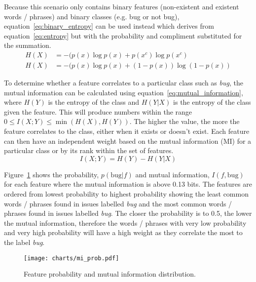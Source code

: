 Because this scenario only contains binary features (non-existent and existent words / phrases) and binary classes
(e.g. bug or not bug), equation~\ref{eq:binary_entropy} can be used instead which derives from equation~\ref{eq:entropy} but
with the probability and compliment substituted for the summation.
\begin{equation}
    \label{eq:binary_entropy}
    \begin{split}
        H(X) &= -(p(x) \log p(x) + p(x^c)     \log p(x^c)    \\
        H(X) &= -(p(x) \log p(x) + (1 - p(x)) \log(1 - p(x))
    \end{split}
\end{equation}

To determine whether a feature correlates to a particular class such as \textit{bug}, the mutual information can be calculated
using equation~\ref{eq:mutual_information}, where $H(Y)$ is the entropy of the class and $H(Y|X)$ is the entropy of the class
given the feature. This will produce numbers within the range $0 \leq I(X;Y) \leq \min(H(X), H(Y))$. The higher the value, the
more the feature correlates to the class, either when it exists or doesn't exist. Each feature can then have an independent
weight based on the mutual information (MI) for a particular class or by its rank within the set of features.
\begin{equation}
    \label{eq:mutual_information}
    I(X;Y) = H(Y) - H(Y|X)
\end{equation}

Figure~\ref{fig:mi_prob} shows the probability, $p(\mathrm{bug}|f)$ and mutual information, $I(f,\mathrm{bug})$ for each feature
where the mutual information is above 0.13 bits. The features are ordered from lowest probability to highest probability showing
the least common words / phrases found in issues labelled \textit{bug} and the most common words / phrases found in issues
labelled \textit{bug}. The closer the probability is to 0.5, the lower the mutual information, therefore the words / phrases
with very low probability and very high probability will have a high weight as they correlate the most to the label
\textit{bug}.
\begin{figure}[h]
    \centering
    \texttt{[image: charts/mi\_prob.pdf]}
    \caption{Feature probability and mutual information distribution.}
    \label{fig:mi_prob}
\end{figure}

